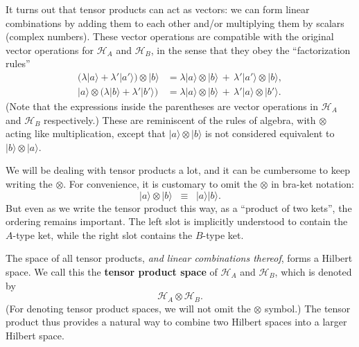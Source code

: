 \documentclass[pra,12pt]{revtex4-2}
\begin{document}
It turns out that tensor products can act as vectors: we can form
linear combinations by adding them to each other and/or multiplying
them by scalars (complex numbers).  These vector operations are
compatible with the original vector operations for $\mathscr{H}_A$ and
$\mathscr{H}_B$, in the sense that they obey the ``factorization
rules''
\begin{align}
  \Big(\lambda |a\rangle
  + \lambda' |a'\rangle\Big) \otimes |b\rangle &=
  \lambda |a\rangle \otimes |b\rangle \,+\,
  \lambda' |a'\rangle \otimes |b\rangle, \label{tensorrule1} \\
  |a\rangle \otimes \Big(\lambda |b\rangle
  + \lambda' |b'\rangle\Big) &=
  \lambda |a\rangle \otimes |b\rangle \,+\,
  \lambda' |a\rangle \otimes |b'\rangle.
  \label{tensorrule2} 
\end{align}
(Note that the expressions inside the parentheses are vector
operations in $\mathscr{H}_A$ and $\mathscr{H}_B$ respectively.)
These are reminiscent of the rules of algebra, with $\otimes$ acting
like multiplication, except that $|a\rangle\otimes|b\rangle$ is not
considered equivalent to $|b\rangle\otimes|a\rangle$.

We will be dealing with tensor products a lot, and it can be
cumbersome to keep writing the $\otimes$.  For convenience, it is
customary to omit the $\otimes$ in bra-ket notation:
\begin{equation}
  |a \rangle \otimes |b\rangle \;\; \equiv \;\; |a \rangle |b\rangle.
\end{equation}
But even as we write the tensor product this way, as a ``product of
two kets'', the ordering remains important.  The left slot is
implicitly understood to contain the $A$-type ket, while the right
slot contains the $B$-type ket.

The space of all tensor products, \textit{and linear combinations
  thereof}, forms a Hilbert space.  We call this the \textbf{tensor
  product space} of $\mathscr{H}_A$ and $\mathscr{H}_B$, which is
denoted by
\begin{equation*}
  \mathscr{H}_A\otimes \mathscr{H}_B.
\end{equation*}
(For denoting tensor product spaces, we will not omit the $\otimes$
symbol.)  The tensor product thus provides a natural way to combine
two Hilbert spaces into a larger Hilbert space.
\end{document}
